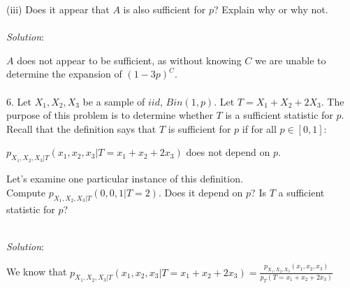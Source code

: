 \documentclass[12pt]{article}
\newcommand{\XB}{\color{black}}
\newcommand{\XBB}{\color{blue}}
\newcommand{\XV}{\color{violet}}
\begin{document}

(iii) Does it appear that $ A $ is also sufficient for $ p $? Explain why or why not. \\
\vspace{2.5mm} \\
\textit{Solution}:
\vspace{2.5mm}

\noindent 
$ A $ does not appear to be sufficient, as without knowing $ C $ we are unable to determine the expansion of $ (1 -3p)^{C} $. \\

\newpage
\XBB\hrulefill\XB \\

6. Let $ X_{1}, X_{2}, X_{3} $ be a sample of $ iid $, $ Bin(1,p) $. Let $ T = X_{1} + X_{2} + 2X_{3} $. 
The purpose of this problem is to determine whether $ T $ is a sufficient statistic for $ p $.
Recall that the definition says that $ T $ is sufficient for $ p $ if for all $ p \in [0, 1] $: \\
\begin{center}
    $ p_{X_{1}, X_{2}, X_{3} | T}(x_{1}, x_{2}, x_{3} | T = x_{1} + x_{2} + 2x_{3}) $ does not depend on $ p $. \\
\end{center}
Let’s examine one particular instance of this definition. \\ 
\indent Compute $ p_{X_{1}, X_{2}, X_{3} | T}(0, 0, 1 | T = 2) $. Does it depend on $ p $? Is $ T $ a sufficient statistic for $ p $?

\XBB\hrulefill\XB 
\vspace{5mm} \\


\textit{Solution}:
\vspace{2.5mm}

\noindent 
We know that $ \displaystyle p_{X_{1}, X_{2}, X_{3} | T}(x_{1}, x_{2}, x_{3} | T = x_{1} + x_{2} + 2x_{3}) = \frac{p_{X_{1}, X_{2}, X_{3}}(x_{1}, x_{2}, x_{3})}{p_{T}(T = x_{1} + x_{2} + 2x_{3})} $
\end{document}
